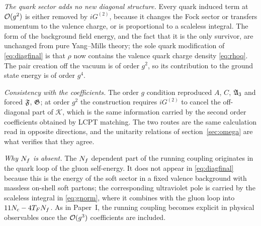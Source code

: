 \emph{The quark sector adds no new diagonal structure.} Every quark induced term at $\mathcal{O}(g^{2})$ is
either removed by $iG^{(2)}$, because it changes the Fock sector or transfers momentum to the valence
charge, or is proportional to a scaleless integral. The form of the background field energy, and the
fact that it is the only survivor, are unchanged from pure Yang--Mills theory; the sole quark
modification of \eqref{eq:diagfinal} is that $\rho$ now contains the valence quark charge density
\eqref{eq:rhoq}. The pair creation off the vacuum is of order $g^{2}$, so its contribution to the
ground state energy is of order $g^{4}$.

\emph{Consistency with the coefficients.} The order $g$ condition reproduced $A$, $C$, $\mathfrak{A}_{3}$ and
forced $\mathfrak{F}$, $\mathfrak{G}$; at order $g^{2}$ the construction requires $iG^{(2)}$ to cancel the off-diagonal part
of $\mathcal K$, which is the same information carried by the second order coefficients obtained by
LCPT matching. The two routes are the same calculation read in opposite directions, and the
unitarity relations of section~\ref{sec:omega} are what verifies that they agree.

\emph{Why $N_{f}$ is absent.} The $N_{f}$ dependent part of the running coupling originates in the quark
loop of the gluon self-energy. It does not appear in \eqref{eq:diagfinal} because this is the energy
of the soft sector in a fixed valence background with massless on-shell soft partons; the
corresponding ultraviolet pole is carried by the scaleless integral in \eqref{eq:gnorm}, where it
combines with the gluon loop into $11N_{c}-4T_{F}N_{f}$. As in Paper~I, the running coupling becomes
explicit in physical observables once the $\mathcal{O}(g^{3})$ coefficients are included.
